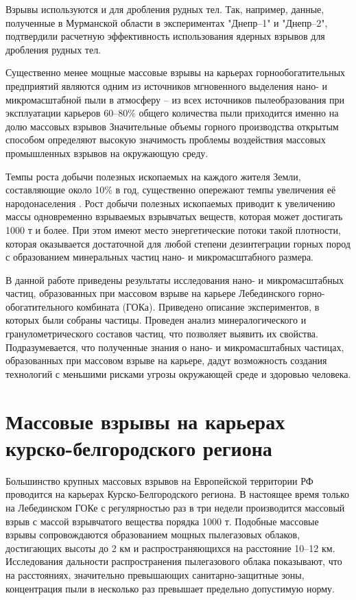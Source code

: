 Взрывы используются и для дробления рудных тел. Так, например, данные, полученные в Мурманской области в экспериментах "Днепр–1" и "Днепр–2", подтвердили расчетную эффективность использования ядерных взрывов для дробления рудных тел. 

Существенно менее мощные массовые взрывы на карьерах горнообогатительных предприятий являются одним из источников мгновенного выделения нано- и микромасштабной пыли в атмосферу – из всех источников пылеобразования при эксплуатации карьеров 60–80\% общего количества пыли приходится именно на долю массовых взрывов \cite{bib01,bib01} Значительные объемы горного производства открытым способом определяют высокую значимость проблемы воздействия массовых промышленных взрывов на окружающую среду.

Темпы роста добычи полезных ископаемых на каждого жителя Земли, составляющие около 10\% в год, существенно опережают темпы увеличения её народонаселения \cite{bib09}. Рост добычи полезных ископаемых приводит к увеличению массы одновременно взрываемых взрывчатых веществ, которая может достигать 1000 т и более. При этом имеют место энергетические потоки такой плотности, которая оказывается достаточной для любой степени дезинтеграции горных пород с образованием минеральных частиц нано- и микромасштабного размера.

В данной работе приведены результаты исследования нано- и микромасштабных частиц, образованных при массовом взрыве на карьере Лебединского горно-обогатительного комбината (ГОКа). Приведено описание экспериментов, в которых были собраны частицы. Проведен анализ минералогического и гранулометрического составов частиц, что позволяет выявить их свойства. Подразумевается, что полученные знания о нано- и микромасштабных частицах, образованных при массовом взрыве на карьере, дадут возможность создания технологий с меньшими рисками угрозы окружающей среде и здоровью человека.

\section{Массовые взрывы на карьерах курско-белгородского региона} \label{sect2_1}


Большинство крупных массовых взрывов на Европейской территории РФ проводится на карьерах Курско-Белгородского региона. В настоящее время только на Лебединском ГОКе с регулярностью раз в три недели производится массовый взрыв с массой взрывчатого вещества порядка 1000 т. Подобные массовые взрывы сопровождаются образованием мощных пылегазовых облаков, достигающих высоты до 2 км и распространяющихся на расстояние 10–12 км. Исследования дальности распространения пылегазового облака показывают, что на расстояниях, значительно превышающих санитарно-защитные зоны, концентрация пыли в несколько раз превышает предельно допустимую норму.

